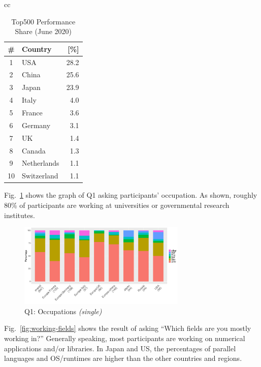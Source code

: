 \documentclass[conference,10pt,letterpaper]{IEEEtran}
\begin{document}
\begin{table}[htb]
\begin{center}
\begin{tabular}[t]{cc}
\begin{minipage}[t]{0.5\hsize}
        \begin{center}%
          \caption{Top500 Performance Share (June 2020)}%
          \label{tab:top500-share}%
          \begin{tabular}{c|l|r}%
            \hline%
            \# & Country & [\%] \\%
            \hline%
            1  & USA 	  & 28.2 \\%
            2  & China 	  & 25.6 \\%
            3  & Japan 	  & 23.9 \\%
            4  & Italy	  & 4.0  \\%
            5  & France	  & 3.6  \\%
            6  & Germany 	  & 3.1  \\%
            7  & UK		  & 1.4  \\%
            8  & Canada	  & 1.3  \\%
            9  & Netherlands  & 1.1  \\%
            10 & Switzerland  & 1.1  \\%
            \hline%
          \end{tabular}%
        \end{center}%
      \end{minipage}%
    \end{tabular}%
  \end{center}%
\end{table}%

%
%
Fig.~\ref{fig:occupations} shows the graph of Q1 asking participants'
occupation. As shown, roughly 80\% of participants are working at 
universities or governmental research institutes.
%
\begin{figure}[htb]
  \begin{center}
    \includegraphics[width=8cm]{R-scripts/Q1.pdf}
    \caption{Q1: Occupations {\it(single)}}
    \label{fig:occupations}
  \end{center}
\end{figure}

Fig.~\ref{fig:working-fields} shows the result of asking ``Which
fields are you mostly working in?'' Generally speaking, most
participants are working on numerical applications and/or
libraries. In Japan and US, the percentages of parallel languages and
OS/runtimes are higher than the other countries and regions.
\end{document}
